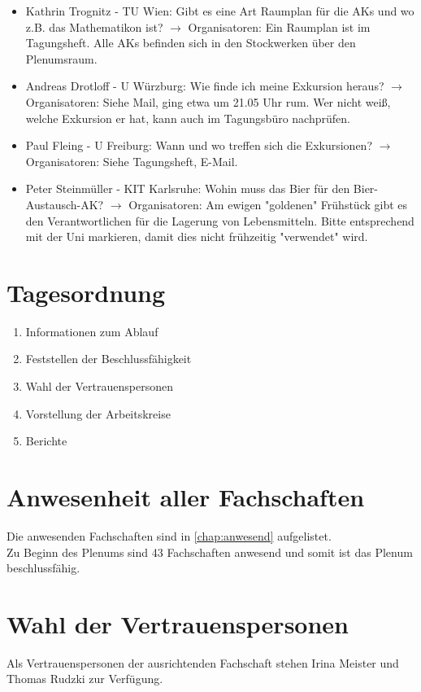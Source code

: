 \begin{itemize}
    \item Kathrin Trognitz - TU Wien:  Gibt es eine Art Raumplan für die AKs und wo z.B. das Mathematikon ist? $\rightarrow$ Organisatoren: Ein Raumplan ist im Tagungsheft. Alle AKs befinden sich in den Stockwerken über den Plenumsraum.
    \item Andreas Drotloff - U Würzburg:  Wie finde ich meine Exkursion heraus? $\rightarrow$ Organisatoren: Siehe Mail, ging etwa um 21.05 Uhr rum. Wer nicht weiß, welche Exkursion er hat, kann auch im Tagungsbüro nachprüfen.
    \item Paul Fleing - U Freiburg:  Wann und wo treffen sich die Exkursionen? $\rightarrow$ Organisatoren: Siehe Tagungsheft, E-Mail.
    \item Peter Steinmüller - KIT Karlsruhe:  Wohin muss das Bier für den Bier-Austausch-AK? $\rightarrow$ Organisatoren: Am ewigen "goldenen" Frühstück gibt es den Verantwortlichen für die Lagerung von Lebensmitteln. Bitte entsprechend mit der Uni markieren, damit dies nicht frühzeitig "verwendet" wird.
  \end{itemize}

\section{Tagesordnung}
  \begin{enumerate}
    \item Informationen zum Ablauf
    \item Feststellen der Beschlussfähigkeit
    \item Wahl der Vertrauenspersonen
    \item Vorstellung der Arbeitskreise
    \item Berichte
  \end{enumerate}

\section{Anwesenheit aller Fachschaften}
  Die anwesenden Fachschaften sind in \autoref{chap:anwesend} aufgelistet. \\
  Zu Beginn des Plenums sind 43 Fachschaften anwesend und somit ist das Plenum beschlussfähig.

\section{Wahl der Vertrauenspersonen}

  Als Vertrauenspersonen der ausrichtenden Fachschaft stehen Irina Meister und Thomas Rudzki zur Verfügung. \\

